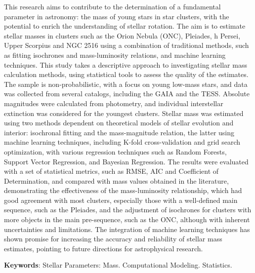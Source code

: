 %
%


\begin{center}
\imprimirtitleenglish
\end{center}

\begin{resumo}[Abstract]
            This research aims to contribute to the determination of a fundamental parameter in astronomy: the mass of young stars in star clusters, with the potential to enrich the understanding of stellar rotation. The aim is to estimate stellar masses in clusters such as the Orion Nebula (ONC), Pleiades, h Persei, Upper Scorpius and NGC 2516 using a combination of traditional methods, such as fitting isochrones and mass-luminosity relations, and machine learning techniques. This study takes a descriptive approach to investigating stellar mass calculation methods, using statistical tools to assess the quality of the estimates. The sample is non-probabilistic, with a focus on young low-mass stars, and data was collected from several catalogs, including the GAIA and the TESS.  Absolute magnitudes were calculated from photometry, and individual interstellar extinction was considered for the youngest clusters. Stellar mass was estimated using two methods dependent on theoretical models of stellar evolution and interior: isochronal fitting and the mass-magnitude relation, the latter using machine learning techniques, including K-fold cross-validation and grid search optimization, with various regression techniques such as Random Forests, Support Vector Regression, and Bayesian Regression. The results were evaluated with a set of statistical metrics, such as RMSE, AIC and Coefficient of Determination, and compared with mass values obtained in the literature, demonstrating the effectiveness of the mass-luminosity relationship, which had good agreement with most clusters, especially those with a well-defined main sequence, such as the Pleiades, and the adjustment of isochrones for clusters with more objects in the main pre-sequence, such as the ONC, although with inherent uncertainties and limitations. The integration of machine learning techniques has shown promise for increasing the accuracy and reliability of stellar mass estimates, pointing to future directions for astrophysical research.

            \vspace*{12 pt}

            
            \textbf{Keywords}: Stellar Parameters: Mass. Computational Modeling. Statistics.

\end{resumo}

	
